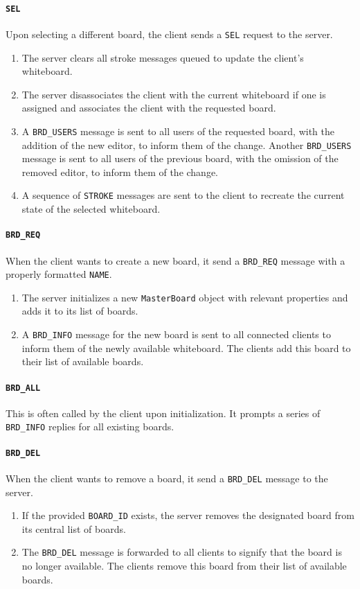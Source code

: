 \paragraph{\texttt{SEL}} Upon selecting a different board, the client sends a \texttt{SEL} request to the server.
\begin{enumerate}
\item The server clears all stroke messages queued to update the client's whiteboard.
\item The server disassociates the client with the current whiteboard if one is assigned and associates the client with the requested board.
\item A \texttt{BRD\_USERS} message is sent to all users of the requested board, with the addition of the new editor, to inform them of the change. Another \texttt{BRD\_USERS} message is sent to all users of the previous board, with the omission of the removed editor, to inform them of the change.
\item A sequence of \texttt{STROKE} messages are sent to the client to recreate the current state of the selected whiteboard.
\end{enumerate}

\paragraph{\texttt{BRD\_REQ}} When the client wants to create a new board, it send a \texttt{BRD\_REQ} message with a properly formatted \texttt{NAME}.
\begin{enumerate}
\item The server initializes a new \texttt{MasterBoard} object with relevant properties and adds it to its list of boards.
\item A \texttt{BRD\_INFO} message for the new board is sent to all connected clients to inform them of the newly available whiteboard. The clients add this board to their list of available boards.
\end{enumerate}

\paragraph{\texttt{BRD\_ALL}} This is often called by the client upon initialization. It prompts a series of \texttt{BRD\_INFO} replies for all existing boards.

\paragraph{\texttt{BRD\_DEL}} When the client wants to remove a board, it send a \texttt{BRD\_DEL} message to the server.
\begin{enumerate}
\item If the provided \texttt{BOARD\_ID} exists, the server removes the designated board from its central list of boards.
\item The \texttt{BRD\_DEL} message is forwarded to all clients to signify that the board is no longer available. The clients remove this board from their list of available boards.
\end{enumerate}

